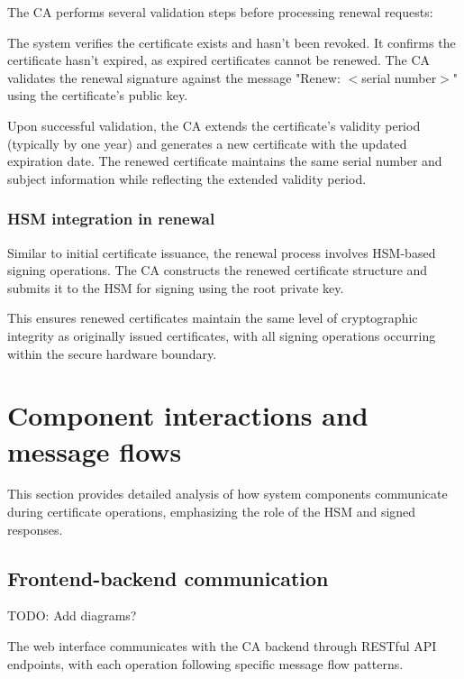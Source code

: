 The CA performs several validation steps before processing renewal requests:

The system verifies the certificate exists and hasn't been revoked. It confirms 
the certificate hasn't expired, as expired certificates cannot be renewed. 
The CA validates the renewal signature against the message "Renew: $<$serial number$>$" 
using the certificate's public key.

Upon successful validation, the CA extends the certificate's validity period 
(typically by one year) and generates a new certificate with the updated expiration 
date. The renewed certificate maintains the same serial number and subject 
information while reflecting the extended validity period.

\subsubsection{HSM integration in renewal}

Similar to initial certificate issuance, the renewal process involves HSM-based 
signing operations. The CA constructs the renewed certificate structure and 
submits it to the HSM for signing using the root private key.

This ensures renewed certificates maintain the same level of cryptographic 
integrity as originally issued certificates, with all signing operations 
occurring within the secure hardware boundary.

\section{Component interactions and message flows}

This section provides detailed analysis of how system components communicate during 
certificate operations, emphasizing the role of the HSM and signed responses.

\subsection{Frontend-backend communication}
{\color{red}TODO: Add diagrams?}

The web interface communicates with the CA backend through RESTful API endpoints, 
with each operation following specific message flow patterns.

